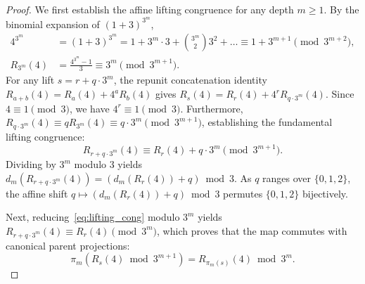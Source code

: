 \documentclass[11pt,reqno]{amsart}
\theoremstyle{plain}
\theoremstyle{definition}
\theoremstyle{remark}
\begin{document}
\begin{proof}
We first establish the affine lifting congruence for any depth $m \ge 1$. By the binomial expansion of $(1 + 3)^{3^m}$,
\begin{align}
4^{3^m} &= (1 + 3)^{3^m} = 1 + 3^m \cdot 3 + \binom{3^m}{2} 3^2 + \dots \equiv 1 + 3^{m+1} \pmod{3^{m+2}}, \\
R_{3^m}(4) &= \frac{4^{3^m} - 1}{3} \equiv 3^m \pmod{3^{m+1}}.
\end{align}
For any lift $s = r + q \cdot 3^m$, the repunit concatenation identity $R_{a+b}(4) = R_a(4) + 4^a R_b(4)$ gives $R_s(4) = R_r(4) + 4^r R_{q \cdot 3^m}(4)$. Since $4 \equiv 1 \pmod 3$, we have $4^r \equiv 1 \pmod 3$. Furthermore, $R_{q \cdot 3^m}(4) \equiv q R_{3^m}(4) \equiv q \cdot 3^m \pmod{3^{m+1}}$, establishing the fundamental lifting congruence:
\begin{equation}\label{eq:lifting_cong}
R_{r + q \cdot 3^m}(4) \equiv R_r(4) + q \cdot 3^m \pmod{3^{m+1}}.
\end{equation}
Dividing by $3^m$ modulo $3$ yields $d_m(R_{r + q \cdot 3^m}(4)) = (d_m(R_r(4)) + q) \bmod 3$. As $q$ ranges over $\{0, 1, 2\}$, the affine shift $q \mapsto (d_m(R_r(4)) + q) \bmod 3$ permutes $\{0, 1, 2\}$ bijectively.

Next, reducing~\eqref{eq:lifting_cong} modulo $3^m$ yields $R_{r + q \cdot 3^m}(4) \equiv R_r(4) \pmod{3^m}$, which proves that the map commutes with canonical parent projections:
\begin{equation}
\pi_m(R_s(4) \bmod 3^{m+1}) = R_{\pi_m(s)}(4) \bmod 3^m.
\end{equation}


\end{proof}
\end{document}
